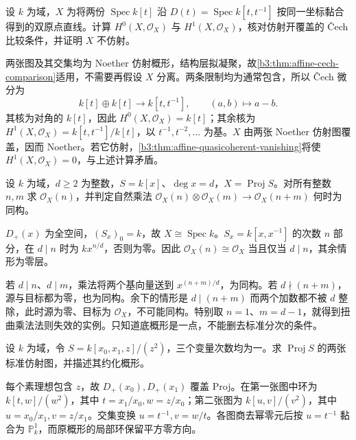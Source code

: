 \begin{optionalexercise}\label{b3:ex:24-double-origin-cech}
	设 \(k\) 为域，\(X\) 为将两份 \(\operatorname{Spec}k[t]\) 沿 \(D(t)=\operatorname{Spec}k[t,t^{-1}]\) 按同一坐标黏合得到的双原点直线。计算 \(H^0(X,\mathcal O_X)\) 与 \(H^1(X,\mathcal O_X)\)，核对仿射开覆盖的 Čech 比较条件，并证明 \(X\) 不仿射。
\end{optionalexercise}
\begin{solution}
	两张图及其交集均为 Noether 仿射概形，结构层拟凝聚，故\cref{b3:thm:affine-cech-comparison}适用，不需要再假设 \(X\) 分离。两条限制均为通常包含，所以 Čech 微分为
	\[
		k[t]\oplus k[t]\longrightarrow k[t,t^{-1}], \qquad(a,b)\longmapsto a-b.
	\]
	其核为对角的 \(k[t]\)，因此 \(H^0(X,\mathcal O_X)=k[t]\)；其余核为 \(H^1(X,\mathcal O_X)=k[t,t^{-1}]/k[t]\)，以 \(t^{-1},t^{-2},\ldots\) 为基。\(X\) 由两张 Noether 仿射图覆盖，因而 Noether。若它仿射，\cref{b3:thm:affine-quasicoherent-vanishing}将使 \(H^1(X,\mathcal O_X)=0\)，与上述计算矛盾。
\end{solution}

\begin{optionalexercise}\label{b3:ex:24-weighted-twist}
	设 \(k\) 为域，\(d\ge2\) 为整数，\(S=k[x]\)、\(\deg x=d\)，\(X=\operatorname{Proj}S\)。对所有整数 \(n,m\) 求 \(\mathcal O_X(n)\)，并判定自然乘法 \(\mathcal O_X(n)\otimes\mathcal O_X(m)\to\mathcal O_X(n+m)\) 何时为同构。
\end{optionalexercise}
\begin{solution}
	\(D_+(x)\) 为全空间，\((S_x)_0=k\)，故 \(X\cong\operatorname{Spec}k\)。\(S_x=k[x,x^{-1}]\) 的次数 \(n\) 部分，在 \(d\mid n\) 时为 \(kx^{n/d}\)，否则为零。因此 \(\mathcal O_X(n)\cong\mathcal O_X\) 当且仅当 \(d\mid n\)，其余情形为零层。

	若 \(d\mid n\)、\(d\mid m\)，乘法将两个基向量送到 \(x^{(n+m)/d}\)，为同构。若 \(d\nmid(n+m)\)，源与目标都为零，也为同构。余下的情形是 \(d\mid(n+m)\) 而两个加数都不被 \(d\) 整除，此时源为零、目标为 \(\mathcal O_X\)，不可能同构。特别取 \(n=1\)、\(m=d-1\)，就得到扭曲乘法法则失效的实例。只知道底概形是一点，不能删去标准分次的条件。
\end{solution}

\begin{optionalexercise}\label{b3:ex:24-projective-nilpotent-thickening}
	设 \(k\) 为域，令 \(S=k[x_0,x_1,z]/(z^2)\)，三个变量次数均为一。求 \(\operatorname{Proj}S\) 的两张标准仿射图，并描述其约化概形。
\end{optionalexercise}
\begin{solution}
	每个素理想包含 \(z\)，故 \(D_+(x_0),D_+(x_1)\) 覆盖 Proj。在第一张图中环为 \(k[t,w]/(w^2)\)，其中 \(t=x_1/x_0,w=z/x_0\)；第二张图为 \(k[u,v]/(v^2)\)，其中 \(u=x_0/x_1,v=z/x_1\)。交集变换 \(u=t^{-1},v=w/t\)。各图商去幂零元后按 \(u=t^{-1}\) 黏合为 \(\mathbb P_k^1\)，而原概形的局部环保留平方零方向。
\end{solution}

